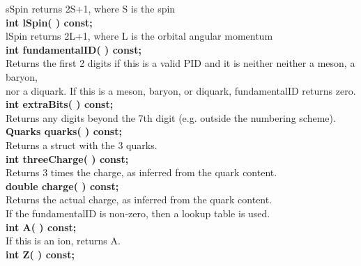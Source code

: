 \begin{tabbing}
\hspace{1.0in}  sSpin returns 2S+1, where S is the spin \\
\hspace{0.5in}  {\bf int  lSpin( )        const; }\\
\hspace{1.0in}  lSpin returns 2L+1, where L is the orbital angular momentum \\
\hspace{0.5in}  {\bf int fundamentalID( ) const; }\\
\hspace{1.0in}  Returns the first 2 digits if this is a valid PID and it is neither
                neither a meson, a baryon, \\
\hspace{1.0in}	nor a diquark.  If this is a meson, baryon, or
		diquark, fundamentalID returns zero. \\
\hspace{0.5in}  {\bf int extraBits( ) const; }\\
\hspace{1.0in}  Returns any digits beyond the 7th digit 
                (e.g. outside the numbering scheme). \\
\hspace{0.5in}  {\bf Quarks quarks( ) const; }\\
\hspace{1.0in}  Returns a struct with the 3 quarks. \\
\hspace{0.5in}  {\bf int threeCharge( ) const; }\\
\hspace{1.0in}  Returns 3 times the charge, as inferred from the quark content.\\
\hspace{0.5in}  {\bf double charge( ) const; }\\
\hspace{1.0in}  Returns the actual charge, as inferred from the quark content.\\
\hspace{1.0in}  If the fundamentalID is non-zero, then a lookup table is used. \\
\hspace{0.5in}  {\bf int A( ) const; }\\
\hspace{1.0in}  If this is an ion, returns A.\\
\hspace{0.5in}  {\bf int Z( ) const; }\\

\end{tabbing}
